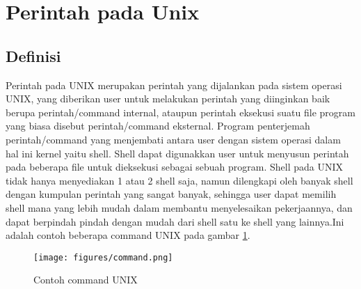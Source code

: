 

	\section{Perintah pada Unix}
		\subsection{Definisi}
		\hspace*{1cm}Perintah pada UNIX merupakan perintah yang dijalankan pada sistem operasi UNIX, yang diberikan user untuk melakukan perintah yang diinginkan baik berupa perintah/command internal, ataupun perintah eksekusi suatu file program yang biasa disebut perintah/command eksternal. Program penterjemah perintah/command yang menjembati antara user dengan sistem operasi dalam hal ini kernel yaitu shell. Shell dapat digunakkan user untuk menyusun perintah pada beberapa file untuk dieksekusi sebagai sebuah program. Shell pada UNIX tidak hanya menyediakan 1 atau 2 shell saja, namun dilengkapi oleh banyak shell dengan kumpulan perintah yang sangat banyak, sehingga user dapat memilih shell mana yang lebih mudah dalam membantu menyelesaikan pekerjaannya, dan dapat berpindah pindah dengan mudah dari shell satu ke shell yang lainnya.Ini adalah contoh beberapa command UNIX pada gambar \ref{command}.
		
		\begin{figure}[ht]
			\centerline{\texttt{[image: figures/command.png]}}
			\caption{Contoh command UNIX}
			\label{command}
			\end{figure}
		
